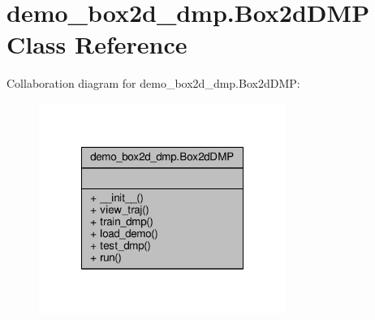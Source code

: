 \hypertarget{classdemo__box2d__dmp_1_1_box2d_d_m_p}{\section{demo\-\_\-box2d\-\_\-dmp.\-Box2d\-D\-M\-P Class Reference}
\label{classdemo__box2d__dmp_1_1_box2d_d_m_p}
}


Collaboration diagram for demo\-\_\-box2d\-\_\-dmp.\-Box2d\-D\-M\-P\-:
\nopagebreak
\begin{figure}[H]
\begin{center}
\leavevmode
\includegraphics[width=228pt]{classdemo__box2d__dmp_1_1_box2d_d_m_p__coll__graph}
\end{center}
\end{figure}
